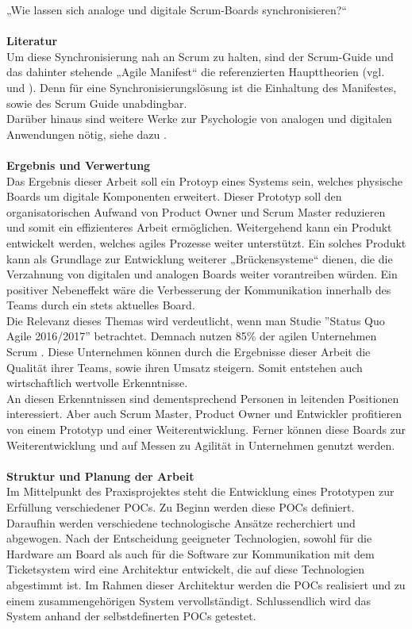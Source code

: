 \documentclass[12pt,titlepage]{scrartcl}
\begin{document}
„Wie lassen sich analoge und digitale Scrum-Boards synchronisieren?“ \\ \\
\textbf{Literatur} \\
Um diese Synchronisierung nah an Scrum zu halten, sind der Scrum-Guide und das dahinter stehende „Agile Manifest“ die referenzierten Haupttheorien (vgl. \cite{manifest} und \cite{guide}). Denn für eine Synchronisierungslösung ist die Einhaltung des Manifestes, sowie des Scrum Guide unabdingbar. \\
Darüber hinaus sind weitere Werke zur Psychologie von analogen und digitalen Anwendungen nötig, siehe dazu \cite{pen}. \\ \\
\textbf{Ergebnis und Verwertung} \\
Das Ergebnis dieser Arbeit soll ein Protoyp eines Systems sein, welches physische Boards um digitale Komponenten erweitert. Dieser Prototyp soll den organisatorischen Aufwand von Product Owner und Scrum Master reduzieren und somit ein effizienteres Arbeit ermöglichen. Weitergehend kann ein Produkt entwickelt werden, welches agiles Prozesse weiter unterstützt. 
Ein solches Produkt kann als Grundlage zur Entwicklung weiterer „Brückensysteme“ dienen, die die Verzahnung von digitalen und analogen Boards weiter vorantreiben würden. Ein positiver Nebeneffekt wäre die Verbesserung der Kommunikation innerhalb des Teams durch ein stets aktuelles Board. \\
Die Relevanz dieses Themas wird verdeutlicht, wenn man Studie ''Status Quo Agile 2016/2017'' betrachtet. Demnach nutzen 85\% der agilen Unternehmen Scrum \cite{hskob}. Diese Unternehmen können durch die Ergebnisse dieser Arbeit die Qualität ihrer Teams, sowie ihren Umsatz steigern. Somit entstehen auch wirtschaftlich wertvolle Erkenntnisse. \\
An diesen Erkenntnissen sind dementsprechend Personen in leitenden Positionen interessiert. Aber auch Scrum Master, Product Owner und Entwickler profitieren von einem Prototyp und einer Weiterentwicklung. Ferner können diese Boards zur Weiterentwicklung und auf Messen zu Agilität in Unternehmen genutzt werden. \\ \\
\textbf{Struktur und Planung der Arbeit} \\
Im Mittelpunkt des Praxisprojektes steht die Entwicklung eines Prototypen zur Erfüllung verschiedener POCs. Zu Beginn werden diese POCs definiert. Daraufhin werden verschiedene technologische Ansätze recherchiert und abgewogen. Nach der Entscheidung geeigneter Technologien, sowohl für die Hardware am Board als auch für die Software zur Kommunikation mit dem Ticketsystem wird eine Architektur entwickelt, die auf diese Technologien abgestimmt ist. Im Rahmen dieser Architektur werden die POCs realisiert und zu einem zusammengehörigen System vervollständigt. Schlussendlich wird das System anhand der selbstdefinerten POCs getestet.\\
\end{document}
